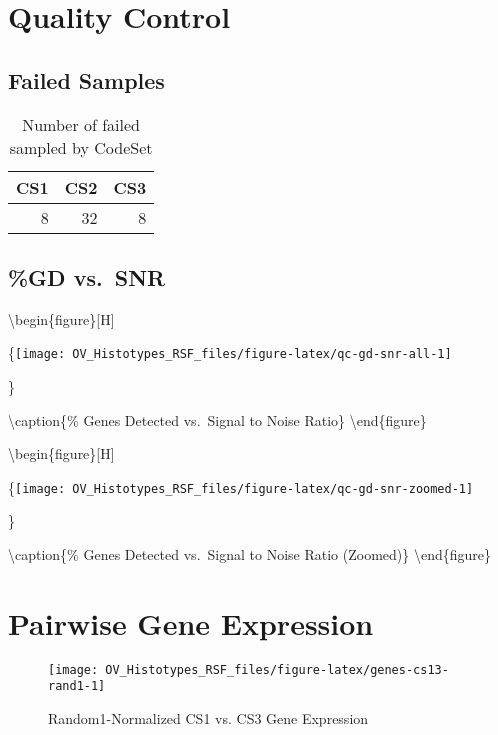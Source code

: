 \documentclass[
]{report}
\begin{document}
\hypertarget{quality-control}{%
\section{Quality Control}\label{quality-control}}

\hypertarget{failed-samples}{%
\subsection{Failed Samples}\label{failed-samples}}

\begin{table}

\caption{\label{tab:qc-failed}Number of failed sampled by CodeSet}
\centering
\begin{tabular}[t]{r|r|r}
\hline
CS1 & CS2 & CS3\\
\hline
8 & 32 & 8\\
\hline
\end{tabular}
\end{table}

\hypertarget{gd-vs.-snr}{%
\subsection{\%GD vs.~SNR}\label{gd-vs.-snr}}

\textbackslash begin\{figure\}{[}H{]}

\{\centering \texttt{[image: OV\_Histotypes\_RSF\_files/figure-latex/qc-gd-snr-all-1]}

\}

\textbackslash caption\{\% Genes Detected vs.~Signal to Noise Ratio\}\label{fig:qc-gd-snr-all}
\textbackslash end\{figure\}

\textbackslash begin\{figure\}{[}H{]}

\{\centering \texttt{[image: OV\_Histotypes\_RSF\_files/figure-latex/qc-gd-snr-zoomed-1]}

\}

\textbackslash caption\{\% Genes Detected vs.~Signal to Noise Ratio (Zoomed)\}\label{fig:qc-gd-snr-zoomed}
\textbackslash end\{figure\}

\hypertarget{pairwise-gene-expression}{%
\section{Pairwise Gene Expression}\label{pairwise-gene-expression}}

\begin{figure}[H]

{\centering \texttt{[image: OV\_Histotypes\_RSF\_files/figure-latex/genes-cs13-rand1-1]} 

}

\caption{Random1-Normalized CS1 vs. CS3 Gene Expression}\label{fig:genes-cs13-rand1}
\end{figure}
\end{document}
